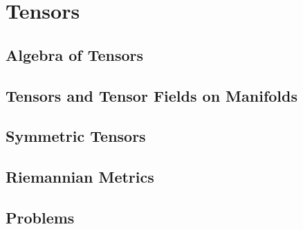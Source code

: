 \chapter{Tensors}
\section{Algebra of Tensors}
\section{Tensors and Tensor Fields on Manifolds}
\section{Symmetric Tensors}
\section{Riemannian Metrics}
\section{Problems}
